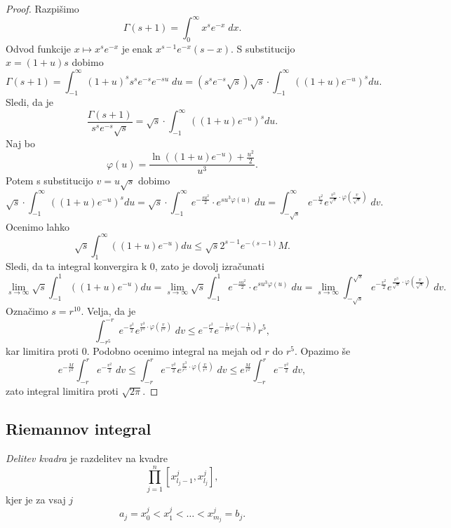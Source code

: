 \begin{proof}
Razpišimo
\[
\Gamma(s+1) = \int_0^\infty x^s e^{-x}\;dx.
\]
Odvod funkcije $x \mapsto x^s e^{-x}$ je enak $x^{s-1}e^{-x}(s-x)$.
S substitucijo $x = (1+u)s$ dobimo
\[
\Gamma(s+1) =
\int_{-1}^{\infty} (1+u)^s s^s e^{-s} e^{-su}\;du =
\left(s^s e^{-s} \sqrt{s}\right) \sqrt{s} \cdot
\int_{-1}^\infty \left((1+u)e^{-u}\right)^s du.
\]
Sledi, da je
\[
\frac{\Gamma(s+1)}{s^s e^{-s}\sqrt{s}} =
\sqrt{s} \cdot \int_{-1}^\infty \left((1+u)e^{-u}\right)^s du.
\]
Naj bo
\[
\varphi(u) = \frac{\ln((1+u)e^{-u}) + \frac{u^2}{2}}{u^3}.
\]
Potem s substitucijo $v = u \sqrt{s}$ dobimo
\[
\sqrt{s} \cdot \int_{-1}^\infty \left((1+u)e^{-u}\right)^s du =
\sqrt{s} \cdot \int_{-1}^\infty
e^{-\frac{su^2}{2}} \cdot e^{su^3\varphi(u)}\;du =
\int_{-\sqrt{s}}^{\infty}
e^{-\frac{v^2}{2}} e^{\frac{v^3}{\sqrt{s}} \cdot \varphi\left(
\frac{v}{\sqrt{s}}
\right)}\;dv.
\]
Ocenimo lahko
\[
\sqrt{s} \int_1^\infty \left((1+u)e^{-u}\right)du \leq
\sqrt{s} 2^{s-1} e^{-(s-1)} M.
\]
Sledi, da ta integral konvergira k $0$, zato je dovolj izračunati
\[
\lim_{s \to \infty}
\sqrt{s} \int_{-1}^{1} \left((1+u)e^{-u}\right)du =
\lim_{s \to \infty} \sqrt{s} \int_{-1}^{1}
e^{-\frac{su^2}{2}} \cdot e^{su^3\varphi(u)}\;du =
\lim_{s \to \infty} \int_{-\sqrt{s}}^{\sqrt{s}}
e^{-\frac{v^2}{2}} e^{\frac{v^3}{\sqrt{s}} \cdot \varphi\left(
\frac{v}{\sqrt{s}}
\right)}\;dv.
\]
Označimo $s = r^{10}$. Velja, da je
\[
\int_{-r^5}^{-r}
e^{-\frac{v^2}{2}} e^{\frac{v^3}{r^5} \cdot \varphi\left(
\frac{v}{r^5}
\right)}\;dv \leq e^{-\frac{r^2}{2}} e^{-\frac{1}{r^2} \varphi
\left(-\frac{1}{r^4}\right)} r^5,
\]
kar limitira proti 0. Podobno ocenimo integral na mejah od $r$ do
$r^5$. Opazimo še
\[
e^{-\frac{M}{r^2}} \int_{-r}^{r} e^{-\frac{v^2}{2}}\;dv \leq
\int_{-r}^{r}
e^{-\frac{v^2}{2}} e^{\frac{v^3}{r^5} \cdot \varphi\left(
\frac{v}{r^5}
\right)}\;dv \leq
e^{\frac{M}{r^2}} \int_{-r}^{r} e^{-\frac{v^2}{2}}\;dv,
\]
zato integral limitira proti $\sqrt{2\pi}$.
\end{proof}

\newpage

\subsection{Riemannov integral}

\begin{definicija}
\emph{Delitev kvadra} je razdelitev na kvadre
\[
\prod_{j=1}^n \left[x_{l_j-1}^j, x_{l_j}^j\right],
\]
kjer je za vsaj $j$
\[
a_j = x_0^j < x_1^j < \dots < x_{m_j}^j = b_j.
\]
\end{definicija}

